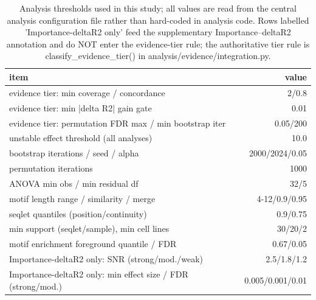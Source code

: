 \begin{table}[htbp]
\centering
\footnotesize
\caption{Analysis thresholds used in this study; all values are read from the central analysis configuration file rather than hard-coded in analysis code. Rows labelled 'Importance-deltaR2 only' feed the supplementary Importance--deltaR2 annotation and do NOT enter the evidence-tier rule; the authoritative tier rule is classify\_evidence\_tier() in analysis/evidence/integration.py.}
\label{tab:methods}
\begin{tabular}{lr}
\toprule
item & value \\
\midrule
evidence tier: min coverage / concordance & 2/0.8 \\
evidence tier: min |delta R2| gain gate & 0.01 \\
evidence tier: permutation FDR max / min bootstrap iter & 0.05/200 \\
unstable effect threshold (all analyses) & 10.0 \\
bootstrap iterations / seed / alpha & 2000/2024/0.05 \\
permutation iterations & 1000 \\
ANOVA min obs / min residual df & 32/5 \\
motif length range / similarity / merge & 4-12/0.9/0.95 \\
seqlet quantiles (position/continuity) & 0.9/0.75 \\
min support (seqlet/sample), min cell lines & 30/20/2 \\
motif enrichment foreground quantile / FDR & 0.67/0.05 \\
Importance-deltaR2 only: SNR (strong/mod./weak) & 2.5/1.8/1.2 \\
Importance-deltaR2 only: min effect size / FDR (strong/mod.) & 0.005/0.001/0.01 \\
\bottomrule
\end{tabular}
\end{table}
